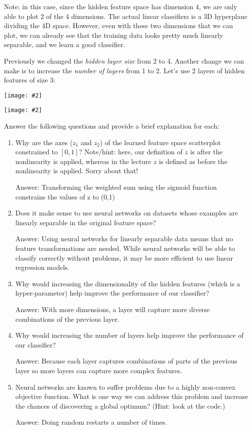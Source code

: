 \documentclass{article}
\newcommand{\blu}[1]{{\textcolor{blu}{#1}}}
\newcommand{\gre}[1]{\textcolor{gre}{#1}}
\newcommand\ans[1]{\par\gre{Answer: #1}}
\let\ask\blu
\newcommand{\centerfig}[2]{\begin{center}\texttt{[image: \#2]}\end{center}}
\begin{document}
Note: in this case, since the hidden feature space has dimension 4, we are only able to plot 2 of the 4 dimensions. The actual linear classifiers is a 3D hyperplane dividing the 4D space. However, even with these two dimensions that we can plot, we can already see that the training data looks pretty much linearly separable, and we learn a good classifier.

Previously we changed the \emph{hidden layer size} from 2 to 4. Another change we can make is to increase the \emph{number of layers} from 1 to 2. Let's use 2 layers of hidden features of size 3:

\centerfig{.7}{./figs/sinusoids_decision_boundary_[3, 3]_2.png}
\centerfig{.7}{./figs/sinusoids_linear_boundary_[3, 3]_2.png}

\ask{Answer the following questions and provide a brief explanation for each:}

\begin{enumerate}
	\item Why are the axes ($z_1$ and $z_2$) of the learned feature space scatterplot constrained to $[0, 1]$? Note/hint: here, our definition of $z$ is after the nonlinearity is applied, whereas in the lecture $z$ is defined as before the nonlinearity is applied. Sorry about that!
 \ans{Transforming the weighted sum using the sigmoid function constrains the values of z to (0,1)}
	\item Does it make sense to use neural networks on datasets whose examples are linearly separable in the original feature space?
  \ans{Using neural networks for linearly separable data means that no feature transformations are needed. While neural networks will be able to classify correctly without problems, it may be more efficient to use linear regression models.}
	\item Why would increasing the dimensionality of the hidden features (which is a hyper-parameter) help improve the performance of our classifier?
\ans{With more dimensions, a layer will capture more diverse combinations of the previous layer.}
	\item Why would increasing the number of layers help improve the performance of our classifier?
 \ans{Because each layer captures combinations of parts of the previous layer so more layers can capture more complex features.}
	\item Neural networks are known to suffer problems due to a highly non-convex objective function. What is one way we can address this problem and increase the chances of discovering a global optimum? (Hint: look at the code.)
 \ans{Doing random restarts a number of times.}
\end{enumerate}
\end{document}
